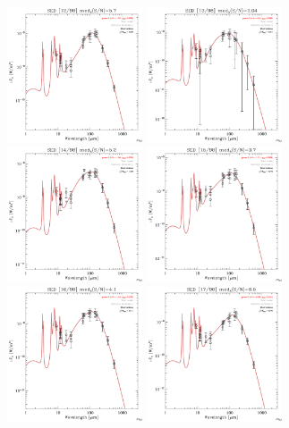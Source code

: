 \documentclass[preprint2,longabstract]{aastex}
\begin{document}
\begin{figure}
	\includegraphics[trim=0 2mm 0 0, clip, width=40mm]{../SEDs/sed_12.pdf}
    \includegraphics[trim=0 2mm 0 0, clip, width=40mm]{../SEDs/sed_13.pdf}
	\includegraphics[trim=0 2mm 0 0, clip, width=40mm]{../SEDs/sed_14.pdf}
	\includegraphics[trim=0 2mm 0 0, clip, width=40mm]{../SEDs/sed_15.pdf}
	\includegraphics[trim=0 2mm 0 0, clip, width=40mm]{../SEDs/sed_16.pdf}
	\includegraphics[trim=0 2mm 0 0, clip, width=40mm]{../SEDs/sed_17.pdf}

\end{figure}
\end{document}
